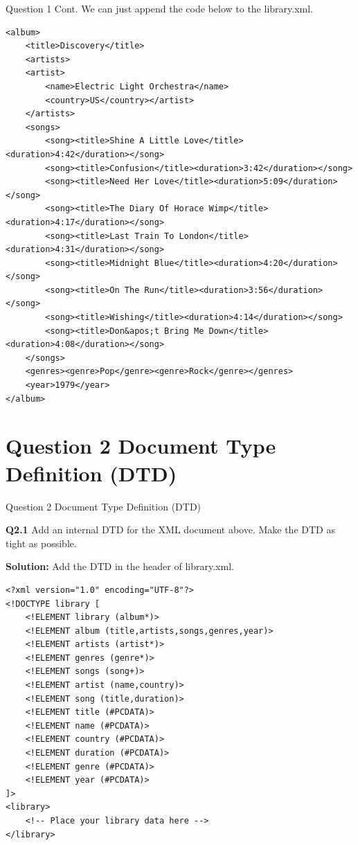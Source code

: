 \begin{frame}[fragile]{Question 1 Cont.}
We can just append the code below to the library.xml.		
\begin{lstlisting}[style=xml-small-nomargin]
<album>
	<title>Discovery</title>
	<artists>
	<artist>
		<name>Electric Light Orchestra</name>
		<country>US</country></artist>
	</artists>
	<songs>
		<song><title>Shine A Little Love</title><duration>4:42</duration></song>
		<song><title>Confusion</title><duration>3:42</duration></song>
		<song><title>Need Her Love</title><duration>5:09</duration></song>
		<song><title>The Diary Of Horace Wimp</title><duration>4:17</duration></song>
		<song><title>Last Train To London</title><duration>4:31</duration></song>
		<song><title>Midnight Blue</title><duration>4:20</duration></song>
		<song><title>On The Run</title><duration>3:56</duration></song>
		<song><title>Wishing</title><duration>4:14</duration></song>
		<song><title>Don&apos;t Bring Me Down</title><duration>4:08</duration></song>
	</songs>
	<genres><genre>Pop</genre><genre>Rock</genre></genres>
	<year>1979</year>
</album>
\end{lstlisting}
\end{frame}

\section*{Question 2 Document Type Definition (DTD)}
\begin{frame}[fragile]{Question 2 Document Type Definition (DTD)}

\textbf{Q2.1} Add an internal DTD for the XML document above. Make the DTD as tight as possible.\\\vspace{3pt}

\textbf{Solution:} Add the DTD in the header of library.xml.

\begin{lstlisting}[style=xml-small]
<?xml version="1.0" encoding="UTF-8"?>
<!DOCTYPE library [
	<!ELEMENT library (album*)>
	<!ELEMENT album (title,artists,songs,genres,year)>
	<!ELEMENT artists (artist*)>
	<!ELEMENT genres (genre*)>
	<!ELEMENT songs (song+)>
	<!ELEMENT artist (name,country)>
	<!ELEMENT song (title,duration)>
	<!ELEMENT title (#PCDATA)>
	<!ELEMENT name (#PCDATA)>
	<!ELEMENT country (#PCDATA)>
	<!ELEMENT duration (#PCDATA)>
	<!ELEMENT genre (#PCDATA)>
	<!ELEMENT year (#PCDATA)>
]>
<library>
	<!-- Place your library data here -->
</library>
\end{lstlisting}
\end{frame}

